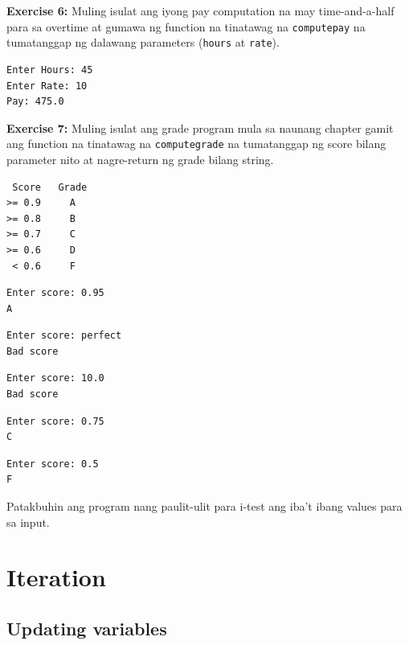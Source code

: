 \documentclass[10pt,]{book}
\begin{document}
\textbf{Exercise 6:} Muling isulat ang iyong pay computation na may
time-and-a-half para sa overtime at gumawa ng function na tinatawag na
\texttt{computepay} na tumatanggap ng dalawang parameters
(\texttt{hours} at \texttt{rate}).

{\small
\begin{verbatim}
Enter Hours: 45
Enter Rate: 10
Pay: 475.0
\end{verbatim}
}

\textbf{Exercise 7:} Muling isulat ang grade program mula sa naunang
chapter gamit ang function na tinatawag na \texttt{computegrade} na
tumatanggap ng score bilang parameter nito at nagre-return ng grade
bilang string.

{\small
\begin{verbatim}
 Score   Grade
>= 0.9     A
>= 0.8     B
>= 0.7     C
>= 0.6     D
 < 0.6     F
\end{verbatim}
}

{\small
\begin{verbatim}
Enter score: 0.95
A
\end{verbatim}
}

{\small
\begin{verbatim}
Enter score: perfect
Bad score
\end{verbatim}
}

{\small
\begin{verbatim}
Enter score: 10.0
Bad score
\end{verbatim}
}

{\small
\begin{verbatim}
Enter score: 0.75
C
\end{verbatim}
}

{\small
\begin{verbatim}
Enter score: 0.5
F
\end{verbatim}
}

Patakbuhin ang program nang paulit-ulit para i-test ang iba't ibang
values para sa input.

\chapter{Iteration}\label{iteration}


\section{Updating variables}\label{updating-variables}

 
\end{document}
